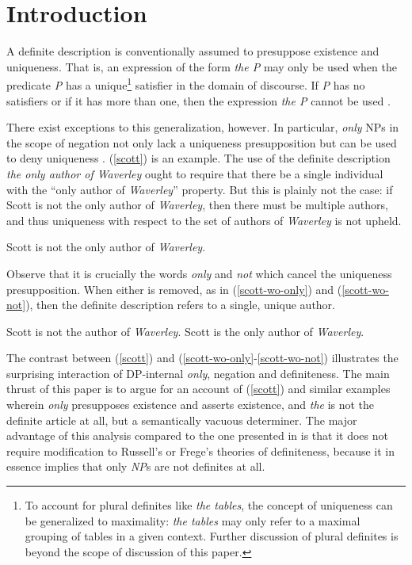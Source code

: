\section{Introduction \label{sec:intro}}
A definite description is conventionally assumed to presuppose existence and uniqueness. That is, an expression of the form \textit{the P} may only be used when the predicate \textit{P} has a unique\footnote{To account for plural definites like \textit{the tables}, the concept of uniqueness can be generalized to maximality: \textit{the tables} may only refer to a maximal grouping of tables in a given context. Further discussion of plural definites is beyond the scope of discussion of this paper.} satisfier in the domain of discourse. If \textit{P} has no satisfiers or if it has more than one, then the expression \textit{the P} cannot be used \citep{frege, russell, horn-abbott-2012}.

There exist exceptions to this generalization, however. In particular, \textit{only} NPs in the scope of negation not only lack a uniqueness presupposition but can be used to deny uniqueness \citep{cb2015}. (\ref{scott}) is an example. The use of the definite description \textit{the only author of Waverley} ought to require that there be a single individual with the ``only author of \textit{Waverley}'' property. But this is plainly not the case: if Scott is not the only author of \textit{Waverley}, then there must be multiple authors, and thus uniqueness with respect to the set of authors of \textit{Waverley} is not upheld.

\begin{exe}
	\ex \label{scott} Scott is not the only author of \textit{Waverley}.
\end{exe}

Observe that it is crucially the words \textit{only} and \textit{not} which cancel the uniqueness presupposition. When either is removed, as in (\ref{scott-wo-only}) and (\ref{scott-wo-not}), then the definite description refers to a single, unique author.

\begin{exe}
	\ex \label{scott-wo-only} Scott is not the author of \textit{Waverley}.
	\ex \label{scott-wo-not} Scott is the only author of \textit{Waverley}.
\end{exe}

The contrast between (\ref{scott}) and (\ref{scott-wo-only}-\ref{scott-wo-not}) illustrates the surprising interaction of DP-internal \textit{only}, negation and definiteness. The main thrust of this paper is to argue for an account of (\ref{scott}) and similar examples wherein \textit{only} presupposes existence and asserts existence, and \textit{the} is not the definite article at all, but a semantically vacuous determiner. The major advantage of this analysis compared to the one presented in \citet{cb2015} is that it does not require modification to Russell's or Frege's theories of definiteness, because it in essence implies that only \textit{NP}s are not definites at all.

